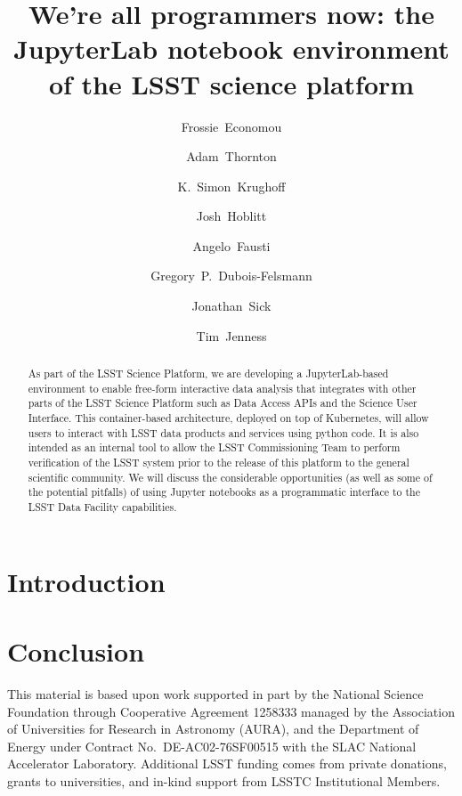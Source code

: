 \documentclass[]{spie}  %
\title{We're all programmers now: the JupyterLab notebook environment of the LSST science platform}
\author[a]{Frossie~Economou}
\author[a]{Adam~Thornton}
\author[a]{K.~Simon~Krughoff}
\author[a]{Josh~Hoblitt}
\author[a]{Angelo~Fausti}
\author[b]{Gregory~P.~Dubois-Felsmann}
\author[a]{Jonathan~Sick}
\author[a]{Tim~Jenness}
\affil[a]{LSST Project Office, 950 N.\ Cherry Avenue, Tucson, AZ 85719, USA}
\affil[b]{IPAC, California Institute of Technology, MS 100-22, Pasadena, CA 91125, USA}
\begin{document}
\maketitle

\begin{abstract}
As part of the LSST Science Platform, we are developing a JupyterLab-based environment to enable free-form interactive data analysis that integrates with other parts of the LSST Science Platform such as Data Access APIs and the Science User Interface.
This container-based architecture, deployed on top of Kubernetes, will allow users to interact with LSST data products and services using python code.
It is also intended as an internal tool to allow the LSST Commissioning Team to perform verification of the LSST system prior to the release of this platform to the general scientific community.
We will discuss the considerable opportunities (as well as some of the potential pitfalls) of using Jupyter notebooks as a programmatic interface to the LSST Data Facility capabilities.
\end{abstract}


\section{Introduction}


\section{Conclusion}

\acknowledgments %

This material is based upon work supported in part by the National Science Foundation through Cooperative Agreement 1258333 managed by the Association of Universities for Research in Astronomy (AURA), and the Department of Energy under Contract No.\ DE-AC02-76SF00515 with the SLAC National Accelerator Laboratory.
Additional LSST funding comes from private donations, grants to universities, and in-kind support from LSSTC Institutional Members.

\end{document}
